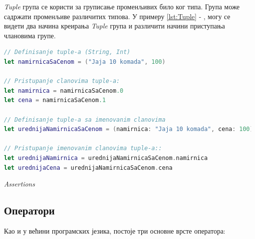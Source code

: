 \documentclass[12pt,oneside]{memoir}
\begin{document}
\indent \textit{Tuple} група се користи за груписање променљивих било ког типа. Група може садржати променљиве различитих типова. У примеру \ref{lst:Tuple} - , могу се видети два начина креирања \textit{Tuple} група и различити начини приступања члановима групе.

\begin{lstlisting}[caption=\textit{{Tuple}}, label={lst:Tuple}, language=Swift, frame=single]
// Definisanje tuple-a (String, Int)
let namirnicaSaCenom = ("Jaja 10 komada", 100)

// Pristupanje clanovima tuple-a:
let namirnica = namirnicaSaCenom.0
let cena = namirnicaSaCenom.1

// Definisanje tuple-a sa imenovanim clanovima
let urednijaNamirnicaSaCenom = (namirnica: "Jaja 10 komada", cena: 100)

// Pristupanje imenovanim clanovima tuple-a::
let urednijaNamirnica = urednijaNamirnicaSaCenom.namirnica
let urednijaCena = urednijaNamirnicaSaCenom.cena
\end{lstlisting}

\indent \textit{Assertions} %

\subsection{Оператори}

\indent Као и у већини програмских језика, постоје три основне врсте оператора: 
\end{document}
